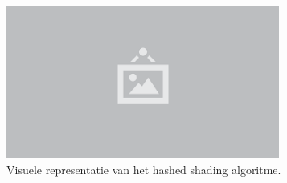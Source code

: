 \begin{figure}
  \centering
  \includegraphics[width=0.8\textwidth]{./img/raw/placeholder.png}
  \caption{Visuele representatie van het hashed shading algoritme.}
  \label{fig:hs-light-assignment-algoritme-p}
\end{figure}
